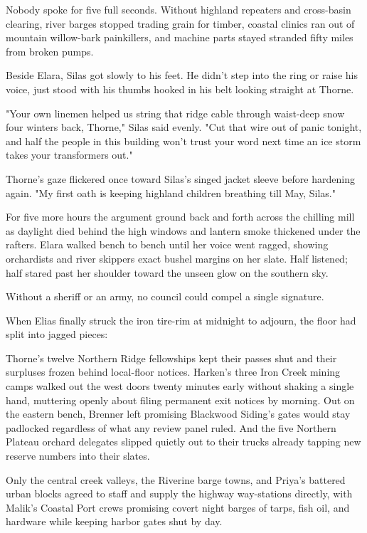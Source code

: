 Nobody spoke for five full seconds. Without highland repeaters and cross-basin clearing, river barges stopped trading grain for timber, coastal clinics ran out of mountain willow-bark painkillers, and machine parts stayed stranded fifty miles from broken pumps.

Beside Elara, Silas got slowly to his feet. He didn't step into the ring or raise his voice, just stood with his thumbs hooked in his belt looking straight at Thorne.

"Your own linemen helped us string that ridge cable through waist-deep snow four winters back, Thorne," Silas said evenly. "Cut that wire out of panic tonight, and half the people in this building won't trust your word next time an ice storm takes your transformers out."

Thorne's gaze flickered once toward Silas's singed jacket sleeve before hardening again. "My first oath is keeping highland children breathing till May, Silas."

For five more hours the argument ground back and forth across the chilling mill as daylight died behind the high windows and lantern smoke thickened under the rafters. Elara walked bench to bench until her voice went ragged, showing orchardists and river skippers exact bushel margins on her slate. Half listened; half stared past her shoulder toward the unseen glow on the southern sky.

Without a sheriff or an army, no council could compel a single signature.

When Elias finally struck the iron tire-rim at midnight to adjourn, the floor had split into jagged pieces:

Thorne's twelve Northern Ridge fellowships kept their passes shut and their surpluses frozen behind local-floor notices. Harken's three Iron Creek mining camps walked out the west doors twenty minutes early without shaking a single hand, muttering openly about filing permanent exit notices by morning. Out on the eastern bench, Brenner left promising Blackwood Siding's gates would stay padlocked regardless of what any review panel ruled. And the five Northern Plateau orchard delegates slipped quietly out to their trucks already tapping new reserve numbers into their slates.

Only the central creek valleys, the Riverine barge towns, and Priya's battered urban blocks agreed to staff and supply the highway way-stations directly, with Malik's Coastal Port crews promising covert night barges of tarps, fish oil, and hardware while keeping harbor gates shut by day.

